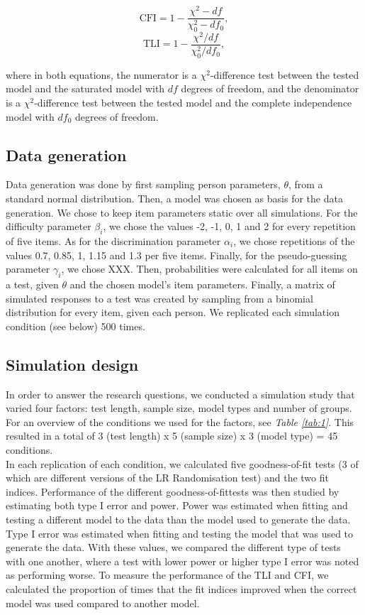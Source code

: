 \documentclass[Royal,sageapa,times,doublespace]{sagej}
\begin{document}
\begin{equation}
\text{CFI} = 1 - \frac{\chi^{2} - df}{\chi^{2}_{0} - df_0},
\end{equation}
\begin{equation}
\text{TLI} = 1 - \frac{\chi^{2}/df}{\chi^{2}_{0}/df_0},
\end{equation}

where in both equations, the numerator is a $\chi^2$-difference test between the tested model and the saturated model with $df$ degrees of freedom, and the denominator is a $\chi^2$-difference test between the tested model and the complete independence model with $df_0$ degrees of freedom.

\subsection{Data generation}
Data generation was done by first sampling person parameters, $\theta$, from a standard normal distribution. Then, a model was chosen as basis for the data generation. We chose to keep item parameters static over all simulations. For the difficulty parameter $\beta_i$, we chose the values -2, -1, 0, 1 and 2 for every repetition of five items. As for the discrimination parameter $\alpha_i$, we chose repetitions of the values 0.7, 0.85, 1, 1.15 and 1.3 per five items. Finally, for the pseudo-guessing parameter $\gamma_i$, we chose XXX. Then, probabilities were calculated for all items on a test, given $\theta$ and the chosen model's item parameters. Finally, a matrix of simulated responses to a test was created by sampling from a binomial distribution for every item, given each person. We replicated each simulation condition (see below) 500 times.

\subsection{Simulation design}
In order to answer the research questions, we conducted a simulation study that varied four factors: test length, sample size, model types and number of groups. For an overview of the conditions we used for the factors, see \textit{Table \ref{tab:1}}. This resulted in a total of 3 (test length) x 5 (sample size) x 3 (model type) = 45 conditions. \\
\indent In each replication of each condition, we calculated five goodness-of-fit tests (3 of which are different versions of the LR Randomisation test) and the two fit indices. Performance of the different goodness-of-fittests was then studied by estimating both type I error and power. Power was estimated when fitting and testing a different model to the data than the model used to generate the data. Type I error was estimated when fitting and testing the model that was used to generate the data. With these values, we compared the different type of tests with one another, where a test with lower power or higher type I error was noted as performing worse.
To measure the performance of the TLI and CFI, we calculated the proportion of times that the fit indices improved when the correct model was used compared to another model.
\end{document}
